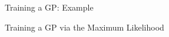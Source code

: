 \begin{frame}[c,allowframebreaks]{Training a GP: Example}


\framebreak




\framebreak



\framebreak



\end{frame}

\begin{frame}[c,allowframebreaks]{Training a GP via the Maximum Likelihood}



\framebreak



\framebreak




\end{frame}


